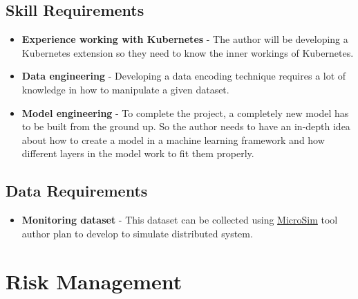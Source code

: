 \subsection{Skill Requirements}
\begin{itemize}
    \item \textbf{Experience working with Kubernetes} - The author will be developing a Kubernetes extension so they need to know the inner workings of Kubernetes.
    \item \textbf{Data engineering} -  Developing a data encoding technique requires a lot of knowledge in how to manipulate a given dataset.
    \item \textbf{Model engineering} - To complete the project, a completely new model has to be built from the ground up. So the author needs to have an in-depth idea about how to create a model in a machine learning framework and how different layers in the model work to fit them properly. 
\end{itemize}

\subsection{Data Requirements}
\begin{itemize}
\item \textbf{Monitoring dataset} -  This dataset can be collected using \hyperref[microsim]{MicroSim} tool author plan to develop to simulate distributed system.
\end{itemize}

\section{Risk Management}


